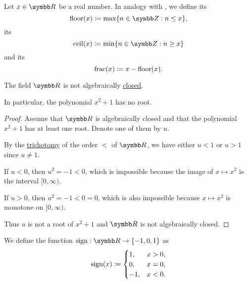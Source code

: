 \begin{definition}\label{def:floor_ceiling_functions}
  Let \( x \in \BR \) be a real number. In analogy with , we define its 
  \begin{equation*}
    \Floor(x) \coloneqq \max \{ n \in \BZ : n \leq x \},
  \end{equation*}
  its 
  \begin{equation*}
    \Ceil(x) \coloneqq \min \{ n \in \BZ : n \geq x \}
  \end{equation*}
  and its 
  \begin{equation*}
    \operatorname{frac}(x) \coloneqq x - \operatorname{floor}(x).
  \end{equation*}
\end{definition}

\begin{proposition}\label{thm:reals_not_algebraically_closed}
  The field \( \BR \) is not algebraically \hyperref[def:algebraically_closed_field]{closed}.

  In particular, the polynomial \( x^2 + 1 \) has no root.
\end{proposition}
\begin{proof}
  Assume that \( \BR \) is algebraically closed and that the polynomial \( x^2 + 1 \) has at least one root. Denote one of them by \( u \).

  By the \hyperref[def:binary_relation/trichotomic]{trichotomy} of the order \( < \) of \( \BR \), we have either \( u < 1 \) or \( u > 1 \) since \( u \neq 1 \).

  If \( u < 0 \), then \( u^2 = -1 < 0 \), which is impossible because the image of \( x \mapsto x^2 \) is the interval \( [0, \infty) \).

  If \( u > 0 \), then \( u^2 = -1 < 0 = 0 \), which is also impossible because \( x \mapsto x^2 \) is monotone on \( [0, \infty) \).

  Thus \( u \) is not a root of \( x^2 + 1 \) and \( \BR \) is not algebraically closed.
\end{proof}

\begin{definition}\label{def:signum}
  We define the  function \( \Sign: \BR \to \{ -1, 0, 1 \} \) as
  \begin{equation*}
    \operatorname{sign}(x) \coloneqq \begin{cases}
      1,  & x > 0, \\
      0,  & x = 0, \\
      -1, & x < 0.
    \end{cases}
  \end{equation*}
\end{definition}
